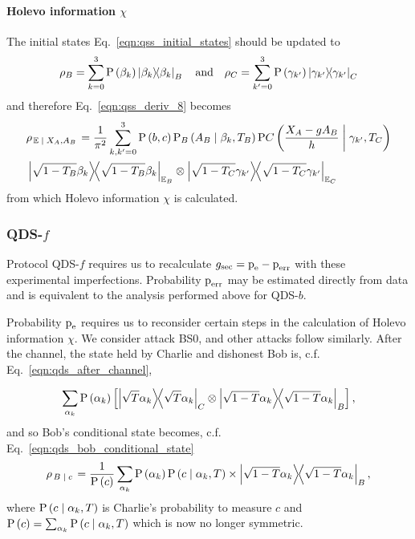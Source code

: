 \paragraph{Holevo information $\chi$}
The initial states Eq.~\ref{eqn:qss_initial_states} should be updated to
\begin{equation}
\rho_B = \sum_{k=0}^3 \text{P}\left(\beta_k\right) \dyad{\beta_k}_B \qq{and} \rho_C = \sum_{k^\prime=0}^3 \text{P}\left(\gamma_{k^\prime}\right) \dyad{\gamma_{k^\prime}}_C
\end{equation}
and therefore Eq.~\ref{eqn:qss_deriv_8} becomes
\begin{align}
&\rho_{\left.\mathbb{E} \given X_A, A_B\right.} = \frac{1}{\pi^2}\sum_{k, k^\prime=0}^3 \text{P}\left(b, c\right) \text{P}_B\left(A_B \given \beta_k, T_B\right) \text{P}C\left(\frac{X_A - g A_B}{h} \given \gamma_{k^\prime}, T_C\right) \notag \\
&\dyad{\sqrt{1-T_B}\beta_k}_{\mathbb{E}_B} \otimes \dyad{\sqrt{1-T_C} \gamma_{k^\prime}}_{\mathbb{E}_C}
\end{align}
from which Holevo information $\chi$ is calculated.

\subsubsection{QDS-$f$}
Protocol QDS-$f$ requires us to recalculate $g_{\text{sec}} = \text{p}_{\text{e}} - \text{p}_{\text{err}}$ with these experimental imperfections. Probability $\text{p}_{\text{err}}$ may be estimated directly from data and is equivalent to the analysis performed above for QDS-$b$.

Probability $\text{p}_{\text{e}}$ requires us to reconsider certain steps in the calculation of Holevo information $\chi$. We consider attack BS$0$, and other attacks follow similarly. After the channel, the state held by Charlie and dishonest Bob is, c.f. Eq.~\ref{eqn:qds_after_channel},

\begin{equation}
\sum_{\alpha_k} \text{P}\left(\alpha_k\right)  \left[ \dyad{\sqrt{T}\alpha_k}_C \otimes \dyad{\sqrt{1-T}\alpha_k}_B\right],
\end{equation}
and so Bob's conditional state becomes, c.f. Eq.~\ref{eqn:qds_bob_conditional_state}
\begin{equation}
\rho_{\left.B \given c\right.} = \frac{1}{\text{P}\left(c\right)} \sum_{\alpha_k} \text{P}\left(\alpha_k\right) \text{P}\left(c \given \alpha_k, T\right) \times \dyad{\sqrt{1-T}\alpha_k}_B,
\end{equation}
where $\text{P}\left(c \; \middle| \; \alpha_k, T\right)$ is Charlie's probability to measure $c$ and $\text{P}\left(c\right) = \sum_{\alpha_k}\text{P}\left(c \; \middle| \; \alpha_k, T\right)$ which is now no longer symmetric.

